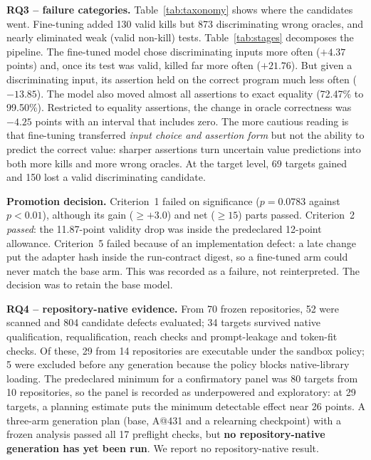 \documentclass[conference,a4paper]{IEEEtran}
\begin{document}
\textbf{RQ3 -- failure categories.} Table~\ref{tab:taxonomy} shows where the
candidates went. Fine-tuning added 130 valid kills but 873 discriminating wrong
oracles, and nearly eliminated weak (valid non-kill) tests. Table~\ref{tab:stages}
decomposes the pipeline. The fine-tuned model chose discriminating inputs more often
($+4.37$ points) and, once its test was valid, killed far more often ($+21.76$). But
given a discriminating input, its assertion held on the correct program much less
often ($-13.85$). The model also moved almost all assertions to exact equality
(72.47\% to 99.50\%). Restricted to equality assertions, the change in oracle
correctness was $-4.25$ points with an interval that includes zero. The more cautious
reading is that fine-tuning transferred \emph{input choice and assertion form} but not
the ability to predict the correct value: sharper assertions turn uncertain value
predictions into both more kills and more wrong oracles. At the target level, 69
targets gained and 150 lost a valid discriminating candidate.

\textbf{Promotion decision.} Criterion~1 failed on significance ($p=0.0783$ against
$p<0.01$), although its gain ($\geq +3.0$) and net ($\geq 15$) parts passed. Criterion~2
\emph{passed}: the 11.87-point validity drop was inside the predeclared 12-point
allowance. Criterion~5 failed because of an implementation defect: a late change put
the adapter hash inside the run-contract digest, so a fine-tuned arm could never match
the base arm. This was recorded as a failure, not reinterpreted. The decision was to
retain the base model.

\textbf{RQ4 -- repository-native evidence.} From 70 frozen repositories, 52 were
scanned and 804 candidate defects evaluated; 34 targets survived native qualification,
requalification, reach checks and prompt-leakage and token-fit checks. Of these, 29
from 14 repositories are executable under the sandbox policy; 5 were excluded before
any generation because the policy blocks native-library loading. The predeclared
minimum for a confirmatory panel was 80 targets from 10 repositories, so the panel is
recorded as underpowered and exploratory: at 29 targets, a planning estimate puts the
minimum detectable effect near 26 points. A three-arm generation plan (base, A@431 and
a relearning checkpoint) with a frozen analysis passed all 17 preflight checks, but
\textbf{no repository-native generation has yet been run}. We report no
repository-native result.

\end{document}

